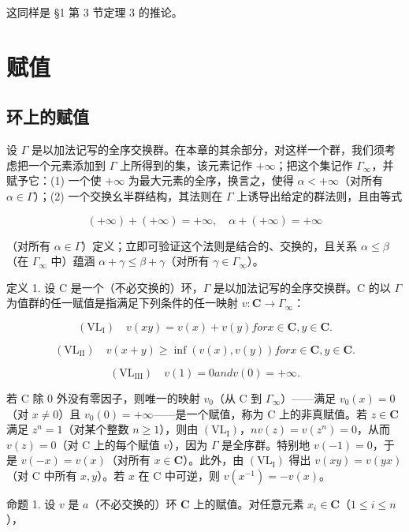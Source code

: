 这同样是 §1 第 3 节定理 3 的推论。

\section{赋值}

\subsection{环上的赋值}

设 \(\Gamma\) 是以加法记写的全序交换群。在本章的其余部分，对这样一个群，我们须考虑把一个元素添加到 \(\Gamma\) 上所得到的集，该元素记作 \(+\infty\)；把这个集记作 \(\Gamma_{\infty}\)，并赋予它：(1) 一个使 \(+\infty\) 为最大元素的全序，换言之，使得 \(\alpha < +\infty\)（对所有 \(\alpha \in \Gamma\)）；(2) 一个交换幺半群结构，其法则在 \(\Gamma\) 上诱导出给定的群法则，且由等式

\[
(+ \infty) + (+ \infty) = + \infty , \quad \alpha + (+ \infty) = + \infty
\]

（对所有 \(\alpha \in \Gamma\)）定义；立即可验证这个法则是结合的、交换的，且关系 \(\alpha \leqslant \beta\)（在 \(\Gamma_{\infty}\) 中）蕴涵 \(\alpha + \gamma \leqslant \beta + \gamma\)（对所有 \(\gamma \in \Gamma_{\infty}\)）。

定义 1. 设 C 是一个（不必交换的）环，\(\Gamma\) 是以加法记写的全序交换群。C 的以 \(\Gamma\) 为值群的任一赋值是指满足下列条件的任一映射 \(v: \mathbf{C} \to \Gamma_{\infty}\)：

\[
(\mathrm{VL}_{\mathrm{I}}) \quad v (x y) = v (x) + v (y) for x \in \mathbf {C}, y \in \mathbf {C}.
\]

\[
(\mathrm{VL}_{\mathrm{II}}) \quad v (x + y) \geqslant \inf (v (x), v (y)) for x \in \mathbf {C}, y \in \mathbf {C}.
\]

\[
(\mathrm{VL} _ {\mathrm{III}}) \quad v (1) = 0 and v (0) = + \infty .
\]

若 C 除 0 外没有零因子，则唯一的映射 \(v_0\)（从 C 到 \(\Gamma_\infty\)）——满足 \(v_0(x) = 0\)（对 \(x \neq 0\)）且 \(v_0(0) = +\infty\)——是一个赋值，称为 C 上的非真赋值。若 \(z \in \mathbf{C}\) 满足 \(z^n = 1\)（对某个整数 \(n \geqslant 1\)），则由 \((\mathrm{VL}_{\mathrm{I}})\)，\(nv(z) = v(z^n) = 0\)，从而 \(v(z) = 0\)（对 C 上的每个赋值 \(v\)），因为 \(\Gamma\) 是全序群。特别地 \(v(-1) = 0\)，于是 \(v(-x) = v(x)\)（对所有 \(x \in \mathbf{C}\)）。此外，由 \((\mathrm{VL}_{\mathrm{I}})\) 得出 \(v(xy) = v(yx)\)（对 C 中所有 \(x, y\)）。若 \(x\) 在 C 中可逆，则 \(v(x^{-1}) = -v(x)\)。

命题 1. 设 \(v\) 是 \(a\)（不必交换的）环 \(\mathbf{C}\) 上的赋值。对任意元素 \(x_{i} \in \mathbf{C}\)（\(1 \leqslant i \leqslant n\)），

